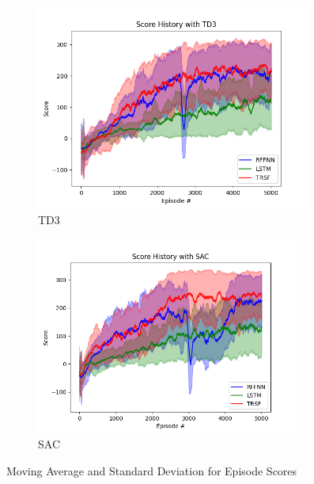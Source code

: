 \begin{figure}[!ht]
	\centering
	\begin{subfigure}{.49\textwidth}
		\centering
		\includegraphics[width=0.99\textwidth]{figures/bipedal/STD_TD3_RFFNN_LSTM_TRSF.png}
		\caption{TD3}
		\label{fig:td3_std_ep_rewards}
	\end{subfigure}
	\begin{subfigure}{.49\textwidth}
		\centering
		\includegraphics[width=0.95\textwidth]{figures/bipedal/STD_SAC_RFFNN_LSTM_TRSF.png}
		\caption{SAC}
		\label{fig:sac_std_ep_rewards}
	\end{subfigure}
	\caption{Moving Average and Standard Deviation for Episode Scores}
\end{figure}

